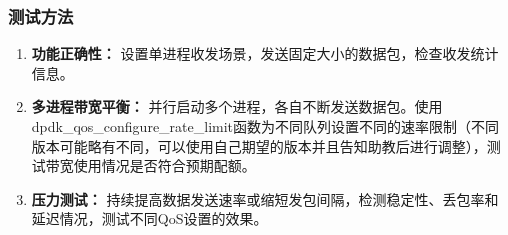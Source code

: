 \subsubsection{测试方法}
\begin{enumerate}
    \item \textbf{功能正确性：}  设置单进程收发场景，发送固定大小的数据包，检查收发统计信息。
    \item \textbf{多进程带宽平衡：}  并行启动多个进程，各自不断发送数据包。使用dpdk\_qos\_configure\_rate\_limit函数为不同队列设置不同的速率限制（不同版本可能略有不同，可以使用自己期望的版本并且告知助教后进行调整），测试带宽使用情况是否符合预期配额。
    \item \textbf{压力测试：} 持续提高数据发送速率或缩短发包间隔，检测稳定性、丢包率和延迟情况，测试不同QoS设置的效果。
\end{enumerate}
